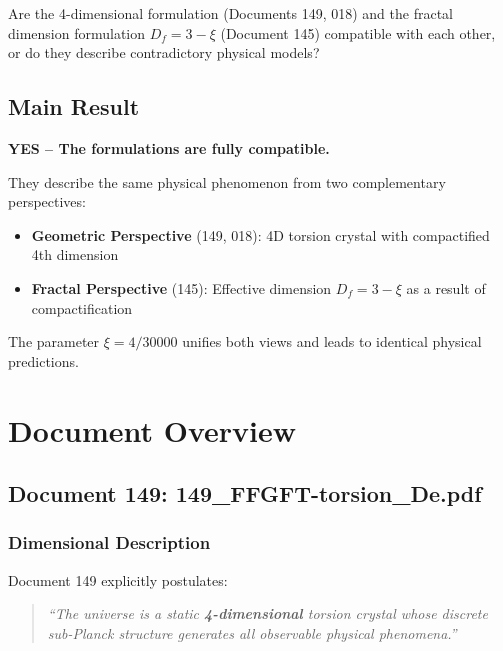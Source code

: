 	\begin{important}
		Are the 4-dimensional formulation (Documents 149, 018) and the fractal dimension formulation $D_f = 3-\xi$ (Document 145) compatible with each other, or do they describe contradictory physical models?
	\end{important}
	
	\subsection{Main Result}
	
	\begin{keyresult}
		\textbf{YES -- The formulations are fully compatible.}
		
		They describe the same physical phenomenon from two complementary perspectives:
		\begin{itemize}
			\item \textbf{Geometric Perspective} (149, 018): 4D torsion crystal with compactified 4th dimension
			\item \textbf{Fractal Perspective} (145): Effective dimension $D_f = 3-\xi$ as a result of compactification
		\end{itemize}
		
		The parameter $\xi = 4/30000$ unifies both views and leads to identical physical predictions.
	\end{keyresult}
	
	\section{Document Overview}
	
	\subsection{Document 149: 149\_FFGFT-torsion\_De.pdf}
	
	\subsubsection{Dimensional Description}
	
	Document 149 explicitly postulates:
	
	\begin{quote}
		\textit{\enquote{The universe is a static \textbf{4-dimensional} torsion crystal whose discrete sub-Planck structure generates all observable physical phenomena.}}
	\end{quote}
	
